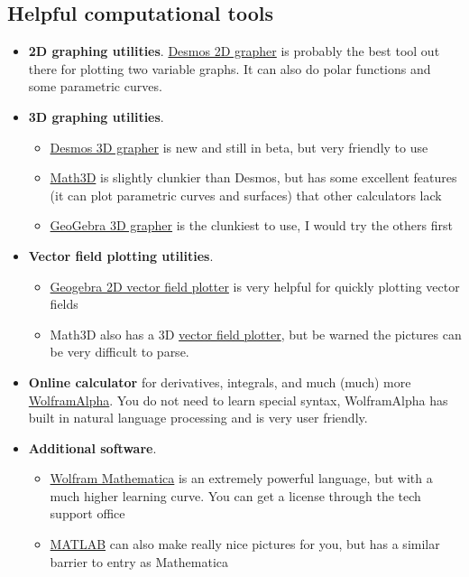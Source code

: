 \documentclass[12pt]{article}
\numberwithin{equation}{subsection}
\numberwithin{figure}{subsection}
\theoremstyle{note}
\begin{document}
{\subsection{Helpful computational tools}
\begin{itemize}
	\item \textbf{2D graphing utilities}. \href{https://www.desmos.com/calculator}{Desmos 2D grapher} is probably the best tool out there for plotting two variable graphs. It can also do polar functions and some parametric curves.
	\item \textbf{3D graphing utilities}.
		\begin{itemize}
			\item \href{https://www.desmos.com/3d}{Desmos 3D grapher} is new and still in beta, but very friendly to use
			\item  \href{https://www.math3d.org/}{Math3D} is slightly clunkier than Desmos, but has some excellent features (it can plot parametric curves and surfaces) that other calculators lack
			\item \href{https://www.geogebra.org/3d}{GeoGebra 3D grapher} is the clunkiest to use, I would try the others first
			\end{itemize}
    	\item \textbf{Vector field plotting utilities}.
	\begin{itemize}
		\item \href{https://www.geogebra.org/m/QPE4PaDZ}{Geogebra 2D vector field plotter} is very helpful for quickly plotting vector fields 
		\item Math3D also has a 3D \href{https://www.math3d.org/Ebm4x79pV}{vector field plotter}, but be warned the pictures can be very difficult to parse.
		\end{itemize}
	\item \textbf{Online calculator} for derivatives, integrals, and much (much) more \href{https://www.wolframalpha.com/}{WolframAlpha}. You do not need to learn special syntax, WolframAlpha has built in natural language processing and is very user friendly. 
	\item \textbf{Additional software}.
	\begin{itemize}
	\item  \href{https://www.wolfram.com/mathematica/}{Wolfram Mathematica} is an extremely powerful language, but with a much higher learning curve. You can get a license through the tech support office
	\item \href{https://www.mathworks.com/products/matlab.html}{MATLAB} can also make really nice pictures for you, but has a similar barrier to entry as Mathematica
	\end{itemize}
\end{itemize}





}
\end{document}
